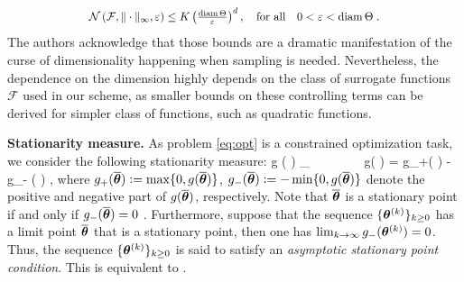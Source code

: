 \documentclass{article}
\newcommand*{\Scale}[2][4]{\scalebox{#1}{$#2$}}%
\begin{document}
\vspace{0.05in}
\[\Scale[0.9]{\mathcal{N}\left(\mathcal{F},\|\cdot\|_{\infty}, \varepsilon\right) \leq K\left(\frac{\operatorname{diam} \Theta}{\varepsilon}\right)^{d},  \quad \textrm{for all} \quad 0<\varepsilon<\operatorname{diam} \Theta\eqsp.}\]
\vspace{0.05in}
The authors acknowledge that those bounds are a dramatic manifestation of the curse of dimensionality happening when sampling is needed.
Nevertheless, the dependence on the dimension highly depends on the class of surrogate functions $\mathcal{F}$ used in our scheme, as smaller bounds on these controlling terms can be derived for simpler class of functions, such as quadratic functions.

\textbf{Stationarity measure.} As problem \eqref{eq:opt} is a constrained optimization task, we consider the following stationarity measure:
\beq \label{eq:stationary_meas}
g ( \op ) \eqdef \inf_{ \param \in \Param } ~~~~~~~~g( \op )  = g_+( \op )  - g_- ( \op ) \eqsp,
\eeq
where  $g_+ ( \op ) \eqdef \max\{ 0, g(\op) \}$, $g_- ( \op )  \eqdef - \min\{0, g(\op)\}$ denote the positive and negative part of $g( \op ) $, respectively.
Note that $\op$ is a stationary point if and only if $g_-( \op ) = 0$ \cite{fletcher2002global}.
Furthermore, suppose that the sequence $\{ \hp{k} \}_{k \geq 0}$ has a limit point $\op$ that is a stationary point, then one has $\lim_{k \rightarrow \infty} g_-( \hp{k} ) = 0$.
Thus, the sequence $\{ \hp{k} \}_{k \geq 0}$ is said to satisfy an \emph{asymptotic stationary point condition}. This is equivalent to \cite[Definition 2.4]{mairal2015miso}.
\end{document}
